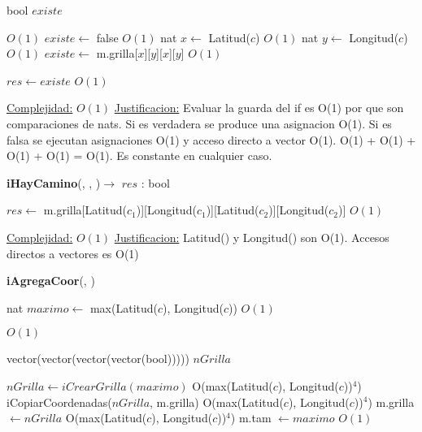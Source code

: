 \begin{Algoritmos}
\begin{algorithm}[H]
\begin{algorithmic}[1]
\State bool $existe$

 \Comment $O(1)$
	\State $existe \gets$ false \Comment $O(1)$
\Else
	\State nat $x \gets$ Latitud($c$) \Comment $O(1)$
	\State nat $y \gets$ Longitud($c$) \Comment $O(1)$
	\State $existe \gets$ m.grilla[$x$][$y$][$x$][$y$] \Comment $O(1)$
\EndIf

\State $res \gets existe$ \Comment $O(1)$

\medskip
\Statex \underline{Complejidad:} $O(1)$
\Statex \underline{Justificacion:} Evaluar la guarda del if es O(1) por que son comparaciones de nats. Si es verdadera se produce una asignacion O(1). Si es falsa se ejecutan asignaciones O(1) y acceso directo a vector O(1). O(1) + O(1) + O(1) + O(1) = O(1). Es constante en cualquier caso.

\end{algorithmic}
\end{algorithm}


\begin{algorithm}[H]
{\textbf{iHayCamino}(, , )$\to$ $res$ : bool}
\begin{algorithmic}[1]

\State $res \gets$ m.grilla[Latitud($c_1$)][Longitud($c_1$)][Latitud($c_2$)][Longitud($c_2$)] \Comment $O(1)$

\medskip
\Statex \underline{Complejidad:} $O(1)$
\Statex \underline{Justificacion:} Latitud() y Longitud() son O(1). Accesos directos a vectores es O(1)

\end{algorithmic}
\end{algorithm}




{\textbf{iAgregaCoor}(, )}
\begin{algorithmic}[1]

\State nat $maximo \gets$ max(Latitud($c$), Longitud($c$))  \Comment $O(1)$

\State {} \Comment $O(1)$

\State vector(vector(vector(vector(bool))))) $nGrilla$

\State $nGrilla \gets iCrearGrilla(maximo)$ \Comment O(max(Latitud($c$), Longitud($c$))$^4$)
\State iCopiarCoordenadas($nGrilla$, m.grilla) \Comment O(max(Latitud($c$), Longitud($c$))$^4$)
\State m.grilla $\gets nGrilla$ \Comment O(max(Latitud($c$), Longitud($c$))$^4$)
\State m.tam $\gets maximo$ \Comment $O(1)$


\end{algorithmic}
\end{Algoritmos}
